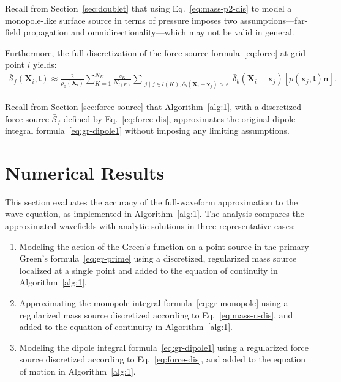 \documentclass[11pt,reqno]{amsart}
\theoremstyle{remark}
\theoremstyle{italic_lemma}
\newcommand{\eps}{\varepsilon}
\newcommand{\bt}{\mathfrak{t}}
\newcommand{\bx}{\boldsymbol{x}}
\newcommand{\bX}{\boldsymbol{X}}
\newcommand{\bn}{\boldsymbol{n}}
\begin{document}
\noindent
Recall from Section~\ref{sec:doublet} that using Eq.~\eqref{eq:mass-p2-dis} to model a monopole-like surface source in terms of pressure imposes two assumptions—far-field propagation and omnidirectionality—which may not be valid in general.


\noindent
\noindent
Furthermore, the full discretization of the force source formula~\eqref{eq:force} at grid point \( i \) yields:
\begin{align}  \label{eq:force-dis}
   \bar{\boldsymbol{\mathcal{S}}}_f (\bX_i, \bt) \approx \frac{2}{\rho_0(\bX_i)}  \sum_{K=1}^{N_K} \frac{s_K }{N_{l(K)}}
   \sum_{\substack{ j \mid j \in l(K), \bar{\delta}_b(\bX_i- \bx_j) > \eps}} \bar{\delta}_b(\bX_i - \bx_j)  
   \left[p(\bx_j, \bt) \bn \right].
\end{align}


Recall from Section \ref{sec:force-source} that Algorithm~\ref{alg:1}, with a discretized force source $\bar{\boldsymbol{\mathcal{S}}}_f$ defined by Eq.~\eqref{eq:force-dis}, approximates the original dipole integral formula~\eqref{eq:gr-dipole1} without imposing any limiting assumptions.  


\section{Numerical Results}  
\label{sec:num_results}  

\noindent  
This section evaluates the accuracy of the full-waveform approximation to the wave equation, as implemented in Algorithm~\ref{alg:1}. The analysis compares the approximated wavefields with analytic solutions in three representative cases:

\begin{enumerate}
  \item Modeling the action of the Green's function on a point source in the primary Green’s formula~\eqref{eq:gr-prime} using a discretized, regularized mass source localized at a single point and added to the equation of continuity in Algorithm~\ref{alg:1}.
  
  \item Approximating the monopole integral formula~\eqref{eq:gr-monopole} using a regularized mass source discretized according to Eq.~\eqref{eq:mass-u-dis}, and added to the equation of continuity in Algorithm~\ref{alg:1}.
  
  \item Modeling the dipole integral formula~\eqref{eq:gr-dipole1} using a regularized force source discretized according to Eq.~\eqref{eq:force-dis}, and added to the equation of motion in Algorithm~\ref{alg:1}.
\end{enumerate}
\end{document}
